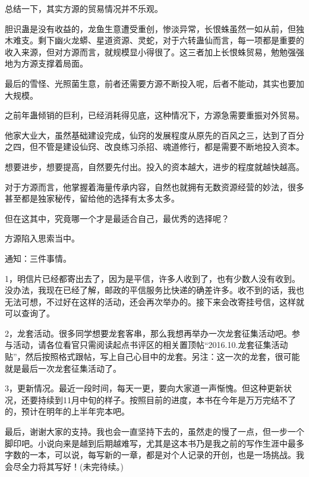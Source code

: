 \begin{this_body}
总结一下，其实方源的贸易情况并不乐观。

胆识蛊是没有收益的，龙鱼生意遭受重创，惨淡异常，长恨蛛虽然一如从前，但独木难支。剩下幽火龙蟒、星道资源、灵蛇，对于六转蛊仙而言，每一项都是重要的收入来源，但对方源而言，就规模显小得很了。这三者加上长恨蛛贸易，勉勉强强地为方源支撑着局面。

最后的雪怪、光照菌生意，前者还需要方源不断投入呢，后者不能动，其实也要加大规模。

之前年蛊倾销的巨利，已经消耗得见底，这种情况下，方源急需要重振对外贸易。

他家大业大，虽然基础建设完成，仙窍的发展程度从原先的百风之三，达到了百分之四，但不管是建设仙窍、改良练习杀招、魂道修行，都是需要不断地投入资本。

想要进步，想要提高，自然要先付出。投入的资本越大，进步的程度就越快越高。

对于方源而言，他掌握着海量传承内容，自然也就拥有无数资源经营的妙法，很多甚至都是独家秘传，留给他的选择有太多太多。

但在这其中，究竟哪一个才是最适合自己，最优秀的选择呢？

方源陷入思索当中。

通知：三件事情。

1，明信片已经都寄出去了，因为是平信，许多人收到了，也有少数人没有收到。没办法，我现在已经了解，邮政的平信服务比快递的确差许多。收不到的话，我也无法可想，不过好在这样的活动，还会再次举办的。接下来会改寄挂号信，这样就可以查询了。

2，龙套活动。很多同学想要龙套客串，那么我想再举办一次龙套征集活动吧。参与活动，请各位看官只需阅读起点书评区的相关置顶帖“2016.10.龙套征集活动贴”，然后按照格式跟帖，写上自己心目中的龙套。另注：这一次的龙套，很可能就是最后一次龙套征集活动了。

3，更新情况。最近一段时间，每天一更，要向大家道一声惭愧。但这种更新状况，还要持续到11月中旬的样子。按照目前的进度，本书在今年是万万完结不了的，预计在明年的上半年完本吧。

最后，谢谢大家的支持。我也会一直坚持下去的，虽然走的慢了一点，但一步一个脚印吧。小说向来是越到后期越难写，尤其是这本书乃是我之前的写作生涯中最多字数的一本，可以说，每写新的一章，都是对个人记录的开创，也是一场挑战。我会尽全力将其写好！(未完待续。)

\end{this_body}

